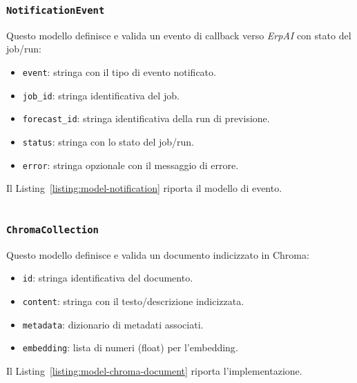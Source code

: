\subsubsection{\texttt{NotificationEvent}}
Questo modello definisce e valida un evento di \gls{callback} verso \textit{ErpAI} con stato del job/run:
\begin{itemize}
    \item \texttt{event}: stringa con il tipo di evento notificato.
    \item \texttt{job\_id}: stringa identificativa del job.
    \item \texttt{forecast\_id}: stringa identificativa della run di previsione.
    \item \texttt{status}: stringa con lo stato del job/run.
    \item \texttt{error}: stringa opzionale con il messaggio di errore.
\end{itemize}
Il Listing~\ref{listing:model-notification} riporta il modello di evento.
\begin{listing}[H]
\inputminted[fontsize=\small, breaklines, breakanywhere=true, linenos=true, bgcolor=gray!10]{python}{code/models/notification.py}
\caption{Modello Pydantic \texttt{NotificationEvent}.}
\label{listing:model-notification}
\end{listing}

\subsubsection{\texttt{ChromaCollection}}
Questo modello definisce e valida un documento indicizzato in Chroma:
\begin{itemize}
    \item \texttt{id}: stringa identificativa del documento.
    \item \texttt{content}: stringa con il testo/descrizione indicizzata.
    \item \texttt{metadata}: dizionario di metadati associati.
    \item \texttt{embedding}: lista di numeri (float) per l’\gls{embedding}.
\end{itemize}
Il Listing~\ref{listing:model-chroma-document} riporta l’implementazione.
\begin{listing}[H]
\inputminted[fontsize=\small, breaklines, breakanywhere=true, linenos=true, bgcolor=gray!10]{python}{code/models/chroma_document.py}
\caption{Modello Pydantic \texttt{ChromaCollection}.}
\label{listing:model-chroma-document}
\end{listing}

